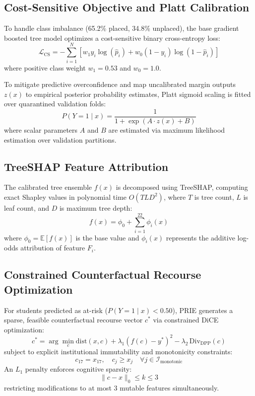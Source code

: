\documentclass[conference]{IEEEtran}
\begin{document}
\subsection{Cost-Sensitive Objective and Platt Calibration}
To handle class imbalance (65.2\% placed, 34.8\% unplaced), the base gradient boosted tree model optimizes a cost-sensitive binary cross-entropy loss:
\begin{equation}
\mathcal{L}_{\text{CS}} = -\sum_{i=1}^N \left[ w_1 y_i \log(\hat{p}_i) + w_0 (1 - y_i) \log(1 - \hat{p}_i) \right]
\end{equation}
where positive class weight $w_1 = 0.53$ and $w_0 = 1.0$.

To mitigate predictive overconfidence and map uncalibrated margin outputs $z(x)$ to empirical posterior probability estimates, Platt sigmoid scaling is fitted over quarantined validation folds:
\begin{equation}
P(Y = 1 \mid x) = \frac{1}{1 + \exp(A \cdot z(x) + B)}
\end{equation}
where scalar parameters $A$ and $B$ are estimated via maximum likelihood estimation over validation partitions.

\subsection{TreeSHAP Feature Attribution}
The calibrated tree ensemble $f(x)$ is decomposed using TreeSHAP, computing exact Shapley values in polynomial time $O(T L D^2)$, where $T$ is tree count, $L$ is leaf count, and $D$ is maximum tree depth:
\begin{equation}
f(x) = \phi_0 + \sum_{i=1}^{22} \phi_i(x)
\end{equation}
where $\phi_0 = \mathbb{E}[f(x)]$ is the base value and $\phi_i(x)$ represents the additive log-odds attribution of feature $F_i$.

\subsection{Constrained Counterfactual Recourse Optimization}
For students predicted as at-risk ($P(Y=1 \mid x) < 0.50$), PRIE generates a sparse, feasible counterfactual recourse vector $c^*$ via constrained DiCE optimization:
\begin{equation}
c^* = \arg\min_c \text{dist}(x, c) + \lambda_1 (f(c) - y^*)^2 - \lambda_2 \, \text{Div}_{\text{DPP}}(c)
\end{equation}
subject to explicit institutional immutability and monotonicity constraints:
\begin{equation}
c_{17} = x_{17}, \quad c_j \ge x_j \quad \forall j \in \mathcal{I}_{\text{monotonic}}
\end{equation}
An $L_1$ penalty enforces cognitive sparsity:
\begin{equation}
\|c - x\|_0 \le k \le 3
\end{equation}
restricting modifications to at most 3 mutable features simultaneously.
\end{document}
